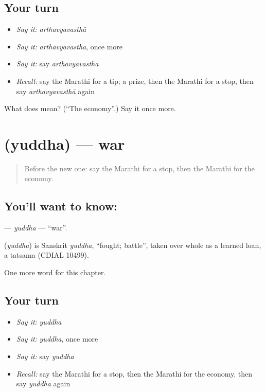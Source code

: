 \subsection*{Your turn}
\begin{itemize}
\raggedright
  \item \emph{Say it:} \emph{arthavyavasthā}
  \item \emph{Say it:} \emph{arthavyavasthā}, once more
  \item \emph{Say it:} say \emph{arthavyavasthā}
  \item \emph{Recall:} say the Marathi for a tip; a prize, then the Marathi for a stop, then say \emph{arthavyavasthā} again
\end{itemize}

\begin{tcolorbox}[breakable,colback=teal!4,colframe=teal!35!black,title={Before you move on}]
What does  mean? (\textquotedblleft{}The economy\textquotedblright{}.) Say it once more.
\end{tcolorbox}
\section[\texorpdfstring{\mr{युद्ध} (yuddha)}{युद्ध (yuddha)}]{ (yuddha) — war}

\label{lesson:MR-C209-yuddha}



\begin{quote}
Before the new one: say the Marathi for a stop, then the Marathi for the economy.
\end{quote}

\subsection*{You'll want to know: }
\textbf{} — \emph{yuddha} — \textquotedblleft{}war\textquotedblright{}.

\begin{cousinweb}
\textbf{} (\emph{yuddha}) is Sanskrit \emph{yuddha}, \textquotedblleft{}fought; battle\textquotedblright{}, taken over whole as a learned loan, a tatsama (CDIAL 10499).
\end{cousinweb}

\begin{grammarlens}[title={What you've built}]
One more word for this chapter.
\end{grammarlens}

\subsection*{Your turn}
\begin{itemize}
\raggedright
  \item \emph{Say it:} \emph{yuddha}
  \item \emph{Say it:} \emph{yuddha}, once more
  \item \emph{Say it:} say \emph{yuddha}
  \item \emph{Recall:} say the Marathi for a stop, then the Marathi for the economy, then say \emph{yuddha} again
\end{itemize}

